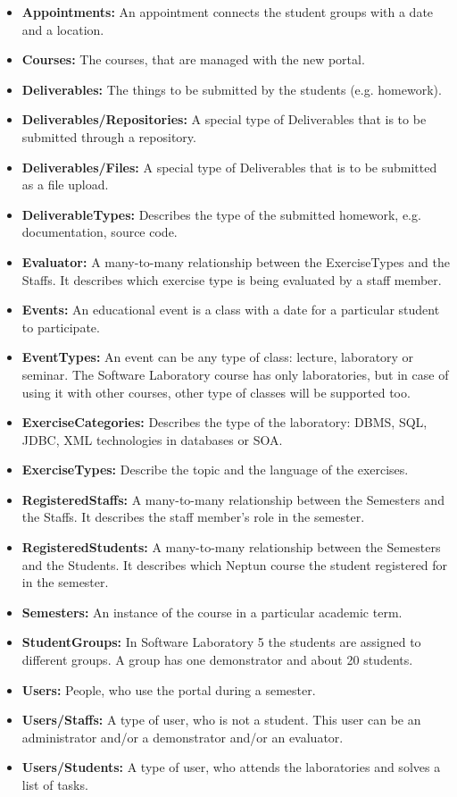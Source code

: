 \begin{itemize}
	\item \textbf{Appointments:} An appointment connects the student groups with a date and a location.
	\item \textbf{Courses:} The courses, that are managed with the new portal.
	\item \textbf{Deliverables:} The things to be submitted by the students (e.g. homework).
	\item \textbf{Deliverables/Repositories:} A special type of Deliverables that is to be submitted through a repository.
	\item \textbf{Deliverables/Files:} A special type of Deliverables that is to be submitted as a file upload.
	\item \textbf{DeliverableTypes:} Describes the type of the submitted homework, e.g. documentation, source code. 
	\item \textbf{Evaluator:} A many-to-many relationship between the ExerciseTypes and the Staffs. It describes which exercise type is being evaluated by a staff member.
	\item \textbf{Events:} An educational event is a class with a date for a particular student to participate.
	\item \textbf{EventTypes:} An event can be any type of class: lecture, laboratory or seminar. The Software Laboratory course has only laboratories, but in case of using it with other courses, other type of classes will be supported too.
	\item \textbf{ExerciseCategories:} Describes the type of the laboratory: DBMS, SQL, JDBC, XML technologies in databases or SOA.
	\item \textbf{ExerciseTypes:} Describe the topic and the language of the exercises. 
	\item \textbf{RegisteredStaffs:} A many-to-many relationship between the Semesters and the Staffs. It describes the staff member's role in the semester.
	\item \textbf{RegisteredStudents:} A many-to-many relationship between the Semesters and the Students. It describes which Neptun course the student registered for in the semester.
	\item \textbf{Semesters:} An instance of the course in a particular academic term.
	\item \textbf{StudentGroups:} In Software Laboratory 5 the students are assigned to different groups. A group has one demonstrator and about 20 students.
	\item \textbf{Users:} People, who use the portal during a semester.
	\item \textbf{Users/Staffs:} A type of user, who is not a student. This user can be an administrator and/or a demonstrator and/or an evaluator.
	\item \textbf{Users/Students:} A type of user, who attends the laboratories and solves a list of tasks.
\end{itemize}

